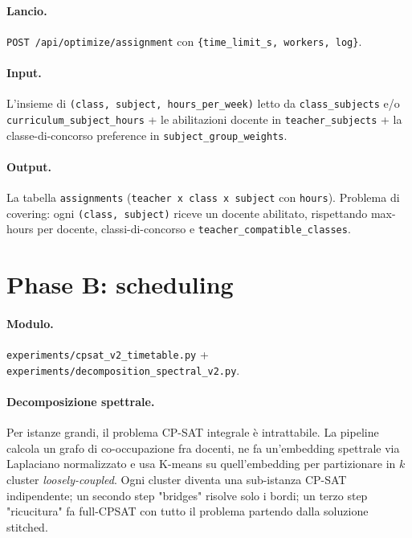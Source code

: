 \paragraph{Lancio.} \texttt{POST /api/optimize/assignment} con
\texttt{\{time\_limit\_s, workers, log\}}.

\paragraph{Input.} L'insieme di \texttt{(class, subject,
hours\_per\_week)} letto da \texttt{class\_subjects} e/o
\texttt{curriculum\_subject\_hours} + le abilitazioni docente in
\texttt{teacher\_subjects} + la classe-di-concorso preference in
\texttt{subject\_group\_weights}.

\paragraph{Output.} La tabella \texttt{assignments}
(\texttt{teacher x class x subject} con \texttt{hours}). Problema di
covering: ogni \texttt{(class, subject)} riceve un docente abilitato,
rispettando max-hours per docente, classi-di-concorso e
\texttt{teacher\_compatible\_classes}.

\section{Phase B: scheduling}

\paragraph{Modulo.} \texttt{experiments/cpsat\_v2\_timetable.py} +
\texttt{experiments/decomposition\_spectral\_v2.py}.

\paragraph{Decomposizione spettrale.}
Per istanze grandi, il problema CP-SAT integrale \`e intrattabile.
La pipeline calcola un grafo di co-occupazione fra docenti, ne fa
un'embedding spettrale via Laplaciano normalizzato e usa K-means su
quell'embedding per partizionare in $k$ cluster
\emph{loosely-coupled}. Ogni cluster diventa una sub-istanza CP-SAT
indipendente; un secondo step "bridges" risolve solo i bordi; un
terzo step "ricucitura" fa full-CPSAT con tutto il problema partendo
dalla soluzione stitched.

